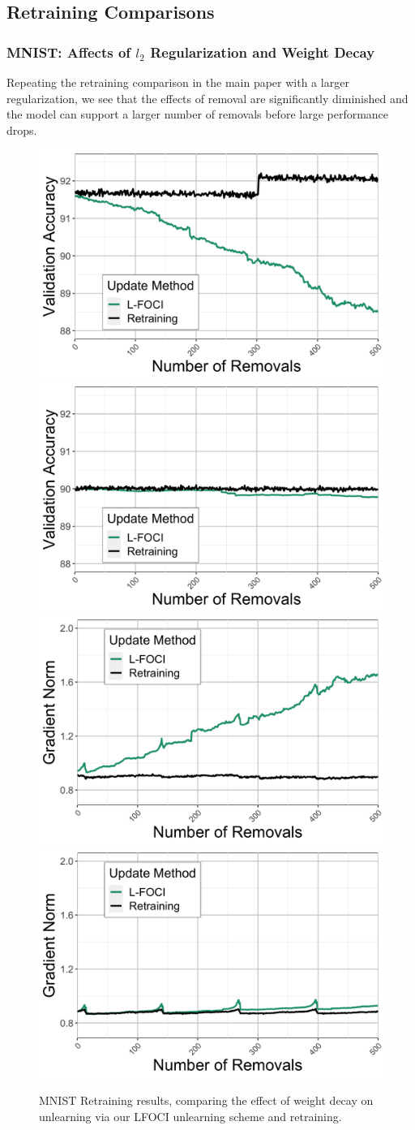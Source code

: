 \subsection{Retraining Comparisons}
\subsubsection{MNIST: Affects of $l_2$ Regularization and Weight Decay}
Repeating the retraining comparison in the main paper with a larger regularization, we see that the effects of removal are significantly diminished and the model can support a larger number of removals before large performance drops.
\begin{figure}
    \centering
    \includegraphics[width=0.24\columnwidth]{5_unlearn/figs/retrain/Retrain_Validation_Accs_0.01.png}
    \includegraphics[width=0.24\columnwidth]{5_unlearn/figs/retrain/Retrain_Validation_Accs_0.1.png}
    \includegraphics[width=0.24\columnwidth]{5_unlearn/figs/retrain/Retrain_Gradient_Norms_0.01.png}
    \includegraphics[width=0.24\columnwidth]{5_unlearn/figs/retrain/Retrain_Gradient_Norms_0.1.png}
    \caption{MNIST Retraining results, comparing the effect of weight decay on unlearning via our LFOCI unlearning scheme and retraining.}
    \label{fig:mnistretrainweightdecay}
\end{figure}

